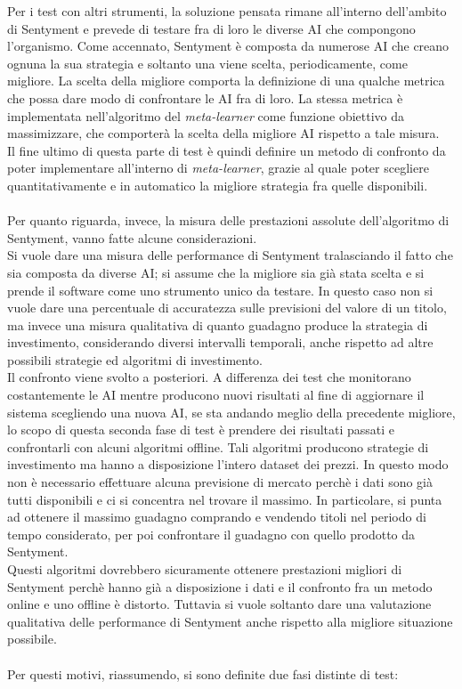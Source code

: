 \documentclass[a4paper,12pt]{report}
\begin{document}
Per i test con altri strumenti, la soluzione pensata rimane all'interno dell'ambito di Sentyment e prevede di testare fra di loro le diverse AI che compongono l'organismo. Come accennato, Sentyment è composta da numerose AI che creano ognuna la sua strategia e soltanto una viene scelta, periodicamente, come migliore. La scelta della migliore comporta la definizione di una qualche metrica che possa dare modo di confrontare le AI fra di loro. La stessa metrica è implementata nell'algoritmo del \textit{meta-learner} come funzione obiettivo da massimizzare, che comporterà la scelta della migliore AI rispetto a tale misura.\\ Il fine ultimo di questa parte di test è quindi definire un metodo di confronto da poter implementare all'interno di \textit{meta-learner}, grazie al quale poter scegliere quantitativamente e in automatico la migliore strategia fra quelle disponibili.\\~\\ Per quanto riguarda, invece, la misura delle prestazioni assolute dell'algoritmo di Sentyment, vanno fatte alcune considerazioni.\\ Si vuole dare una misura delle performance di Sentyment tralasciando il fatto che sia composta da diverse AI; si assume che la migliore sia già stata scelta e si prende il software come uno strumento unico da testare. In questo caso non si vuole dare una percentuale di accuratezza sulle previsioni del valore di un titolo, ma invece una misura qualitativa di quanto guadagno produce la strategia di investimento, considerando diversi intervalli temporali, anche rispetto ad altre possibili strategie ed algoritmi di investimento.\\ Il confronto viene svolto a posteriori. A differenza dei test che monitorano costantemente le AI mentre producono nuovi risultati al fine di aggiornare il sistema scegliendo una nuova AI, se sta andando meglio della precedente migliore, lo scopo di questa seconda fase di test è prendere dei risultati passati e confrontarli con alcuni algoritmi offline. Tali algoritmi producono strategie di investimento ma hanno a disposizione l'intero dataset dei prezzi. In questo modo non è necessario effettuare alcuna previsione di mercato perchè i dati sono già tutti disponibili e ci si concentra nel trovare il massimo. In particolare, si punta ad ottenere il massimo guadagno comprando e vendendo titoli nel periodo di tempo considerato, per poi confrontare il guadagno con quello prodotto da Sentyment.\\ Questi algoritmi dovrebbero sicuramente ottenere prestazioni migliori di Sentyment perchè hanno già a disposizione i dati e il confronto fra un metodo online e uno offline è distorto. Tuttavia si vuole soltanto dare una valutazione qualitativa delle performance di Sentyment anche rispetto alla migliore situazione possibile.\\~\\ Per questi motivi, riassumendo, si sono definite due fasi distinte di test:
\end{document}
